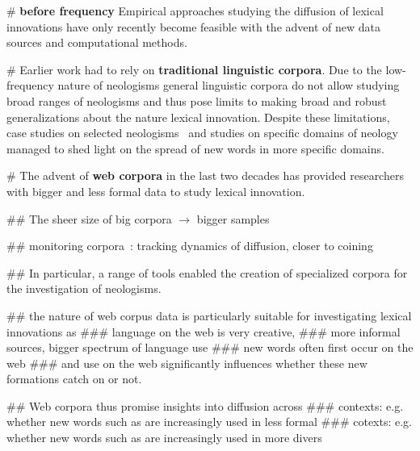 \documentclass[draft, a4paper, abstract=on]{scrartcl}
\renewcommand{\hw}[1]{\textbf{#1}}
\begin{document}
  \begin{easylist}[itemize]

  # \hw{before frequency} Empirical approaches studying the diffusion of lexical innovations have only recently become feasible with the advent of new data sources and computational methods.

  # Earlier work had to rely on \hw{traditional linguistic corpora}. Due to the low-frequency nature of neologisms general linguistic corpora do not allow studying broad ranges of neologisms and thus pose limits to making broad and robust generalizations about the nature lexical innovation. Despite these limitations, case studies on selected neologisms~\parencite{Hohenhaus2006BouncebackabilityWebascorpusbased} and studies on specific domains of neology~\parencite{Elsen2004Neologismen} managed to shed light on the spread of new words in more specific domains.

  # The advent of \hw{web corpora} in the last two decades has provided researchers with bigger and less formal data to study lexical innovation.

  ## The sheer size of big corpora $\rightarrow$ bigger samples

  ## monitoring corpora~\parencite{Davies2013CorpusNews}: tracking dynamics of diffusion, closer to coining

  ## In particular, a range of tools enabled the creation of specialized corpora for the investigation of neologisms.~\parencite{Renouf2006WebCorpIntegrated, Kerremans2012NeoCrawlerIdentifying,LemnitzerWortwarte,Gerard2017LogoscopeSemiautomatic,Cartier2017NeoveilleWeb}

  ## the nature of web corpus data is particularly suitable for investigating lexical innovations as
  ### language on the web is very creative,
  ### more informal sources, bigger spectrum of language use
  ### new words often first occur on the web
  ### and use on the web significantly influences whether these new formations catch on or not.

  ## Web corpora thus promise insights into diffusion across
  ### contexts: e.g. whether new words such as  are increasingly used in less formal
  ### cotexts: e.g. whether new words such as \ol{} are increasingly used in more divers



  \end{easylist}
\end{document}
